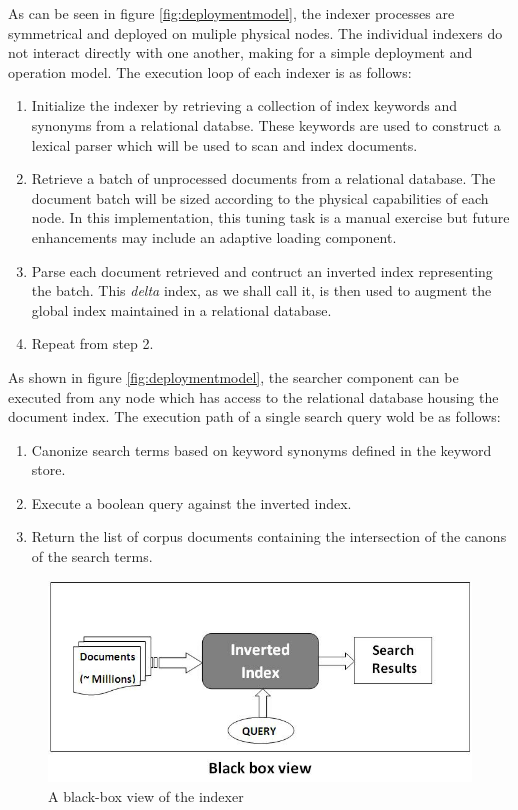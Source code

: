 \documentclass[10pt]{report}
\begin{document}
As can be seen in figure \ref{fig:deploymentmodel}, the indexer
processes are symmetrical and deployed on muliple physical nodes. The
individual indexers do not interact directly with one another, making
for a simple deployment and operation model. The execution loop of
each indexer is as follows:

\begin{enumerate}
\item Initialize the indexer by retrieving a collection of index
  keywords and synonyms from a relational databse. These keywords are
  used to construct a lexical parser which will be used to scan and
  index documents.
\item Retrieve a batch of unprocessed documents from a relational
  database. The document batch will be sized according to the physical
  capabilities of each node. In this implementation, this tuning task
  is a manual exercise but future enhancements may include an adaptive
  loading component.
\item Parse each document retrieved and contruct an inverted index
  representing the batch. This \textit{delta} index, as we shall call
  it, is then used to augment the global index maintained in a
  relational database.
\item Repeat from step 2.
\end{enumerate}

As shown in figure \ref{fig:deploymentmodel}, the searcher component
can be executed from any node which has access to the relational
database housing the document index. The execution path of a single
search query wold be as follows:

\begin{enumerate}
  \item Canonize search terms based on keyword synonyms defined in the
    keyword store.
  \item Execute a boolean query against the inverted index.
  \item Return the list of corpus documents containing the
    intersection of the canons of the search terms.
\end{enumerate}

\begin{figure}
  \begin{center}
	\includegraphics[width=\textwidth,height=!]{blackbox}
  \end{center}
  \caption{A black-box view of the indexer}
  \label{fig:blackbox}
\end{figure} 
\end{document}

